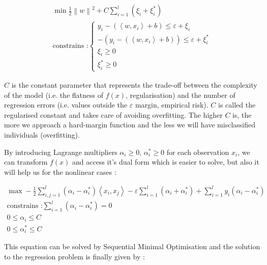 \documentclass[11pt,a4paper,oneside]{book}
\begin{document}
\begin{equation}
\begin{matrix}
\min \frac{1}{2} \left \| w \right \|^{2} + C\sum_{i=1}^{l}(\xi_{i}+\xi_{i}^*)\\
\text{constrains :}
\left\{\begin{matrix}
y_{i} - (\left \langle w, x_{i} \right \rangle + b)\leq \varepsilon + \xi_{i}\\ 
-(y_{i} - (\left \langle w, x_{i} \right \rangle + b))\leq \varepsilon + \xi_{i}^*\\ 
\xi_{i} \geq 0\\ 
\xi_{i}^*\geq 0
\end{matrix}\right. 
\end{matrix}
\end{equation}


$C$\label{cost} is the constant parameter that represents the trade-off between the complexity of the model (i.e. the flatness of $f\left ( x \right )$, regularisation) and the number of regression errors (i.e. values outside the $\varepsilon$ margin, empirical risk). $C$ is called the regularised constant and takes care of avoiding overfitting. The higher $C$ is, the more we approach a hard-margin function and the less we will have misclassified individuals (overfitting).


By introducing Lagrange multipliers $\alpha_i \geq 0$, $\alpha_i^*\geq 0$ for each observation $x_i$, we can transform  $f\left ( x \right )$ and access it's dual form which is easier to solve, but also it will help us for the nonlinear cases \cite{Cortes}\cite{Smola} : 


\begin{equation}
\begin{matrix}
\max -\frac{1}{2} \sum_{i,j = 1}^l \left ( \alpha _i - \alpha _i^* \right )\left \langle x_i, x_j \right \rangle - \varepsilon\sum_{i=1}^l\left ( \alpha _i + \alpha _i^* \right ) + \sum_{i=1}^l y_i\left ( \alpha _i - \alpha _i^* \right )\\
\text{constrains :}
\sum_{i=1}^l \left ( \alpha _i - \alpha _i^* \right) = 0 \\
0 \leq \alpha _i \leq C \\
0 \leq \alpha _i^* \leq C
\end{matrix}
\end{equation}


This equation can be solved by Sequential Minimal Optimisation and the solution to the regression problem is finally given by \cite{Cortes}\cite{Smola}:
\end{document}

